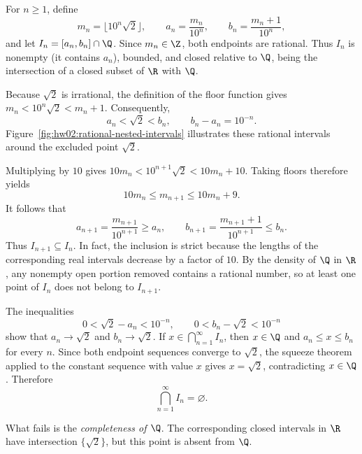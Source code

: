 For $n\geq1$, define
\[
  m_n=\lfloor10^n\sqrt2\rfloor,\qquad
  a_n=\frac{m_n}{10^n},\qquad b_n=\frac{m_n+1}{10^n},
\]
and let $I_n=[a_n,b_n]\cap\Q$. Since $m_n\in\Z$, both endpoints
are rational. Thus $I_n$ is nonempty (it contains $a_n$), bounded,
and closed relative to $\Q$, being the intersection of a closed
subset of $\R$ with $\Q$.

Because $\sqrt2$ is irrational, the definition of the floor function
gives $m_n<10^n\sqrt2<m_n+1$. Consequently,
\[
  a_n<\sqrt2<b_n,\qquad b_n-a_n=10^{-n}.
\]
Figure~\ref{fig:hw02:rational-nested-intervals} illustrates these
rational intervals around the excluded point $\sqrt2$.
\begin{marginfigure}
  \centering
  
  \caption{Schematic intervals $[a_n,b_n]\cap\Q$.
    Hollow markers indicate that $\sqrt2\notin\Q$;
    all endpoints are rational.}
  \label{fig:hw02:rational-nested-intervals}
\end{marginfigure}

Multiplying by $10$ gives $10m_n<10^{n+1}\sqrt2<10m_n+10$.
Taking floors therefore yields
\[
  10m_n\leq m_{n+1}\leq10m_n+9.
\]
It follows that
\[
  a_{n+1}=\frac{m_{n+1}}{10^{n+1}}\geq a_n,
  \qquad
  b_{n+1}=\frac{m_{n+1}+1}{10^{n+1}}\leq b_n.
\]
Thus $I_{n+1}\subseteq I_n$. In fact, the inclusion is strict because
the lengths of the corresponding real intervals decrease by a
factor of $10$. By the density of $\Q$ in $\R$, any nonempty
open portion removed contains a rational number, so at least one
point of $I_n$ does not belong to $I_{n+1}$.

The inequalities
\[
  0<\sqrt2-a_n<10^{-n},\qquad
  0<b_n-\sqrt2<10^{-n}
\]
show that $a_n\to\sqrt2$ and $b_n\to\sqrt2$. If
$x\in\bigcap_{n=1}^{\infty}I_n$, then $x\in\Q$ and
$a_n\leq x\leq b_n$ for every $n$. Since both endpoint sequences
converge to $\sqrt2$, the squeeze theorem applied to the constant
sequence with value $x$ gives $x=\sqrt2$, contradicting $x\in\Q$.
Therefore
\[
  \bigcap_{n=1}^{\infty}I_n=\varnothing.
\]

What fails is the \emph{completeness of $\Q$}. The corresponding
closed intervals in $\R$ have intersection $\{\sqrt2\}$, but this
point is absent from $\Q$.
